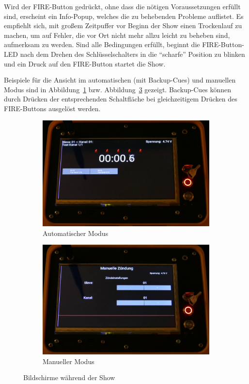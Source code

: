 \documentclass[paper=a4, parskip, numbers=noenddot, toc=listof, headsepline]{scrbook}
\begin{document}
				Wird der FIRE-Button gedrückt, ohne dass die nötigen Voraussetzungen erfüllt sind, erscheint ein Info-Popup, welches die zu behebenden Probleme auflistet. Es empfiehlt sich, mit großem Zeitpuffer vor Beginn der Show einen Trockenlauf zu machen, um auf Fehler, die vor Ort nicht mehr allzu leicht zu beheben sind, aufmerksam zu werden. Sind alle Bedingungen erfüllt, beginnt die FIRE-Button-LED nach dem Drehen des Schlüsselschalters in die \enquote{scharfe} Position zu blinken und ein Druck auf den FIRE-Button startet die Show.
				
				Beispiele für die Ansicht im automatischen (mit Backup-Cues) und manuellen Modus sind in Abbildung~\ref{fig:REFauto} bzw. Abbildung~\ref{fig:REFmanual} gezeigt. Backup-Cues können durch Drücken der entsprechenden Schaltfläche bei gleichzeitigem Drücken des FIRE-Buttons ausgelöst werden.
				
				\begin{figure}
					\begin{subfigure}{\textwidth}
						\includegraphics{Bilder/REFautoshow}
						\caption{Automatischer Modus}
						\label{fig:REFauto}
					\end{subfigure}\newline
					\begin{subfigure}{\textwidth}
						\includegraphics{Bilder/REFmanualshow}
						\caption{Manueller Modus}
						\label{fig:REFmanual}
					\end{subfigure}
					\caption{Bildschirme während der Show}
				\end{figure}
\end{document}
